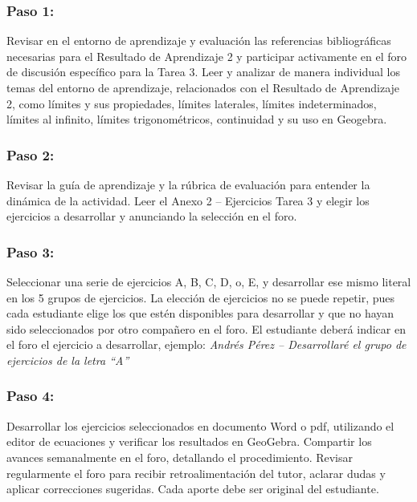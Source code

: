 \documentclass[12pt,letterpaper]{article}
\begin{document}
\subsubsection*{Paso 1:}

Revisar en el entorno de aprendizaje y evaluación las referencias bibliográficas necesarias para el Resultado de Aprendizaje 2 y participar activamente en el foro de discusión específico para la Tarea 3. Leer y analizar de manera individual los temas del entorno de aprendizaje, relacionados con el Resultado de Aprendizaje 2, como límites y sus propiedades, límites laterales, límites indeterminados, límites al infinito, límites trigonométricos, continuidad y su uso en Geogebra.

\subsubsection*{Paso 2:}

Revisar la guía de aprendizaje y la rúbrica de evaluación para entender la dinámica de la actividad. Leer el Anexo 2 -- Ejercicios Tarea 3 y elegir los ejercicios a desarrollar y anunciando la selección en el foro.

\subsubsection*{Paso 3:}

Seleccionar una serie de ejercicios A, B, C, D, o, E, y desarrollar ese mismo literal en los 5 grupos de ejercicios. La elección de ejercicios no se puede repetir, pues cada estudiante elige los que estén disponibles para desarrollar y que no hayan sido seleccionados por otro compañero en el foro. El estudiante deberá indicar en el foro el ejercicio a desarrollar, ejemplo: \textit{Andrés Pérez -- Desarrollaré el grupo de ejercicios de la letra ``A''}

\subsubsection*{Paso 4:}

Desarrollar los ejercicios seleccionados en documento Word o pdf, utilizando el editor de ecuaciones y verificar los resultados en GeoGebra. Compartir los avances semanalmente en el foro, detallando el procedimiento. Revisar regularmente el foro para recibir retroalimentación del tutor, aclarar dudas y aplicar correcciones sugeridas. Cada aporte debe ser original del estudiante.
\end{document}
